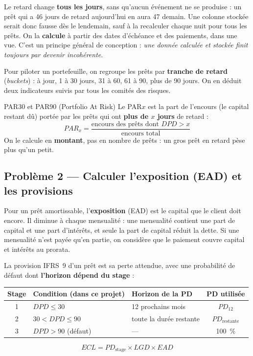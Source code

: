 \begin{observation}
Le retard change \textbf{tous les jours}, sans qu'aucun événement ne se produise : un prêt qui a 46
jours de retard aujourd'hui en aura 47 demain. Une colonne  stockée serait donc
fausse dès le lendemain, sauf à la recalculer chaque nuit pour tous les prêts. On la
\textbf{calcule} à partir des dates d'échéance et des paiements, dans une vue. C'est un principe général
de conception : \emph{une donnée calculée et stockée finit toujours par devenir incohérente}.
\end{observation}

Pour piloter un portefeuille, on regroupe les prêts par \textbf{tranche de retard} (\emph{buckets}) :
à jour, 1 à 30 jours, 31 à 60, 61 à 90, plus de 90 jours. On en déduit deux indicateurs suivis par
tous les comités des risques.

\begin{definition}{PAR30 et PAR90 (Portfolio At Risk)}
Le PAR$x$ est la part de l'encours (le capital restant dû) portée par les prêts qui ont \textbf{plus
de $x$ jours} de retard :
\[
PAR_x = \frac{\text{encours des prêts dont } DPD > x}{\text{encours total}}
\]
On le calcule en \textbf{montant}, pas en nombre de prêts : un gros prêt en retard pèse plus qu'un
petit.
\end{definition}

\subsection{Problème 2 --- Calculer l'exposition (EAD) et les provisions}

Pour un prêt amortissable, l'\textbf{exposition} (EAD) est le capital que le client doit encore. Il
diminue à chaque mensualité : une mensualité contient une part de capital et une part d'intérêts, et
seule la part de capital réduit la dette. Si une mensualité n'est payée qu'en partie, on considère que
le paiement couvre capital et intérêts au prorata.

La provision IFRS~9 d'un prêt est sa perte attendue, avec une probabilité de défaut dont
\textbf{l'horizon dépend du stage} :

\begin{center}\small
\begin{tabular}{@{}cllc@{}}
\toprule
Stage & Condition (dans ce projet) & Horizon de la PD & PD utilisée \\
\midrule
1 & $DPD \leq 30$ & 12 prochains mois & $PD_{12}$ \\
2 & $30 < DPD \leq 90$ & toute la durée restante & $PD_{\text{restante}}$ \\
3 & $DPD > 90$ (défaut) & --- & 100~\% \\
\bottomrule
\end{tabular}
\end{center}
\[
\boxed{\;ECL = PD_{\text{stage}} \times LGD \times EAD\;}
\]

